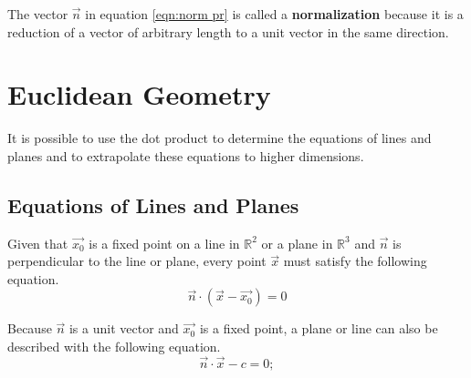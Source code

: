 \documentclass[11pt]{article}
\begin{document}
		The vector $\vec{n}$ in equation \ref{eqn:norm pr} is called a \textbf{normalization} because it is a reduction of a vector of arbitrary length to a unit vector in the same direction.
		
\section{Euclidean Geometry}
	It is possible to use the dot product to determine the equations of lines and planes and to extrapolate these equations to higher dimensions.
	
	\subsection{Equations of Lines and Planes}
		Given that $\vec{x_0}$ is a fixed point on a line in $\mathbb{R}^2$ or a plane in $\mathbb{R}^3$ and $\vec{n}$ is perpendicular to the line or plane, every point $\vec{x}$ must satisfy the following equation.
		\begin{equation}
			\vec{n}\cdot(\vec{x}-\vec{x_0}) = 0
			\label{eqn:plane}
		\end{equation}
		
		Because $\vec{n}$ is a unit vector and $\vec{x_0}$ is a fixed point, a plane or line can also be described with the following equation.
		\begin{equation}
			\vec{n}\cdot\vec{x} - c = 0;
		\end{equation}
		
\end{document}
